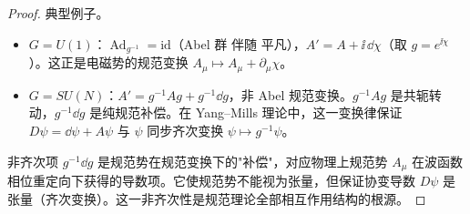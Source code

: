 \begin{proof}
典型例子。
\begin{itemize}
\item $G=U(1)$：$\operatorname{Ad}_{g^{-1}}=\mathrm{id}$（Abel 群 伴随 平凡），$A'=A+\ii\,\dd\chi$（取 $g=e^{\ii\chi}$）。这正是电磁势的规范变换 $A_\mu\mapsto A_\mu+\partial_\mu\chi$。
\item $G=SU(N)$：$A'=g^{-1}Ag+g^{-1}\dd g$，非 Abel 规范变换。$g^{-1}Ag$ 是共轭转动，$g^{-1}\dd g$ 是纯规范补偿。在 Yang--Mills 理论中，这一变换律保证 $D\psi=\dd\psi+A\psi$ 与 $\psi$ 同步齐次变换 $\psi\mapsto g^{-1}\psi$。
\end{itemize}

非齐次项 $g^{-1}\dd g$ 是规范势在规范变换下的"补偿"，对应物理上规范势 $A_\mu$ 在波函数相位重定向下获得的导数项。它使规范势不能视为张量，但保证协变导数 $D\psi$ 是张量（齐次变换）。这一非齐次性是规范理论全部相互作用结构的根源。
\end{proof}

